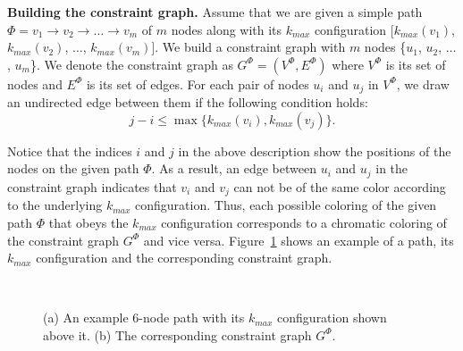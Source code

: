 \documentclass{ws-procs11x85}
\newcommand{\goodgap}{
        \hspace{\subfigtopskip}
        \hspace{\subfigbottomskip}
}
\begin{document}
\noindent
{\bf Building the constraint graph.}
Assume that we are given a simple path $\Phi = v_1 \rightarrow v_2
\rightarrow \ldots \rightarrow v_m$ of $m$ nodes along with its
$k_{max}$ configuration [$k_{max}(v_1)$, $k_{max}(v_2)$, $\ldots$,
$k_{max}(v_m)$]. We build a constraint graph with $m$ nodes \{$u_1$,
$u_2$, $\ldots$, $u_m$\}.  We denote the constraint graph as $G^{\Phi}
= (V^{\Phi}, E^{\Phi})$ where $V^{\Phi}$ is its set of nodes and
$E^{\Phi}$ is its set of edges.  For each pair of nodes $u_i$ and
$u_j$ in $V^{\Phi}$, we draw an undirected edge between them if the
following condition holds:
$$
j - i \leq \max\{k_{max}(v_i), k_{max}(v_j)\}.
$$

Notice that the indices $i$ and $j$ in the above description show the
positions of the nodes on the given path $\Phi$.  As a result, an edge
between $u_i$ and $u_j$ in the constraint graph indicates that $v_i$
and $v_j$ can not be of the same color according to the underlying
$k_{max}$ configuration. Thus, each possible coloring of the given
path $\Phi$ that obeys the $k_{max}$ configuration corresponds to a
chromatic coloring of the constraint graph $G^{\Phi}$ and vice versa.
Figure~\ref{maxk} shows an example of a path, its $k_{max}$
configuration and the corresponding constraint graph.


\begin{figure}
\centering
{}
\\
\caption{(a) An example 6-node path with its $k_{max}$ configuration
  shown above it.  (b) The corresponding constraint graph $G^{\Phi}$.
}
  \label{maxk}
\end{figure}
\end{document}
